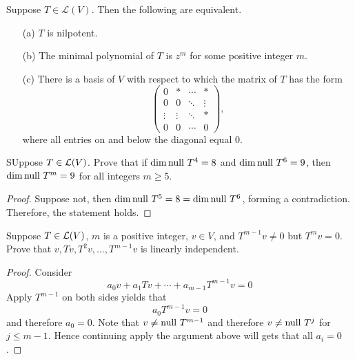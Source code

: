 \documentclass{extarticle}
\begin{document}
\begin{thm}
    Suppose \( T \in \mathcal{L}(V) \). Then the following are equivalent.
    \begin{itemize}
        \item[(a)] \( T \) is nilpotent.
        \item[(b)] The minimal polynomial of \( T \) is \( z^m \) for some positive integer \( m \).
        \item[(c)] There is a basis of \( V \) with respect to which the matrix of \( T \) has the form
        \[
        \begin{pmatrix}
        0 & * & \cdots & * \\
        0 & 0 & \ddots & \vdots \\
        \vdots & \vdots & \ddots & * \\
        0 & 0 & \cdots & 0
        \end{pmatrix},
        \]
        where all entries on and below the diagonal equal 0.
    \end{itemize}
\end{thm}





\newpage 
{}

\begin{problem}{1}
    SUppose \(T \in \mathcal{L}(V)\). Prove that if \(\dim \text{null } T^4 = 8\) and \(\dim 
    \text{null } T^6 = 9\), then \(\dim \text{null } T^m = 9\) for all  integers \(m \geq 5\).
\end{problem}

\begin{proof}
Suppose not, then \(\dim \text{null } T^5 = 8 = \dim \text{null } T^6\), forming a contradiction. Therefore, 
the statement holds. 
\end{proof}


\begin{problem}{2}
    Suppose \(T \in \mathcal{L}(V)\), \(m\) is a positive integer, \(v \in V\), and \(T^{m-1}v  \neq 0\) 
    but \(T^m v = 0\). Prove that \(v, Tv, T^2v, \ldots, T^{m-1}v\) is linearly independent. 
\end{problem}

\begin{proof}
Consider 
\[a_0 v + a_1 Tv + \cdots + a_{m-1}T^{m-1}v = 0\]
Apply \(T^{m-1}\) on both sides yields that 
\[a_0 T^{m-1} v = 0\]
and therefore \(a_0 = 0\). Note that \(v \neq \text{null } T^{m-1}\) and therefore 
\(v \neq \text{null } T^j\) for \(j \leq m-1\). Hence continuing apply the argument above will 
gets that all \(a_i = 0\).
\end{proof}
\end{document}

